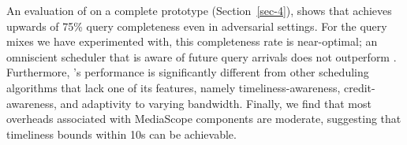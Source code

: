 %

An evaluation of \mscope on a complete prototype (Section~\ref{sec-4}),
shows that \mscope achieves upwards of 75\% query completeness even in
adversarial settings.
%
For the query mixes we have experimented with, this completeness rate
is near-optimal; an omniscient scheduler that is aware of future query
arrivals does not outperform \mscope.
%
Furthermore, \mscope's performance is significantly different from
other scheduling algorithms that lack one of its features, namely
timeliness-awareness, credit-awareness, and adaptivity to varying
bandwidth.
%
Finally, we
find that most overheads
associated with MediaScope components are moderate, suggesting that
timeliness bounds within 10s can be achievable.

%
%

